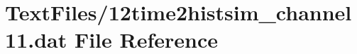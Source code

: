 \hypertarget{12time2histsim__channel11_8dat}{}\section{Text\+Files/12time2histsim\+\_\+channel11.dat File Reference}
\label{12time2histsim__channel11_8dat}
